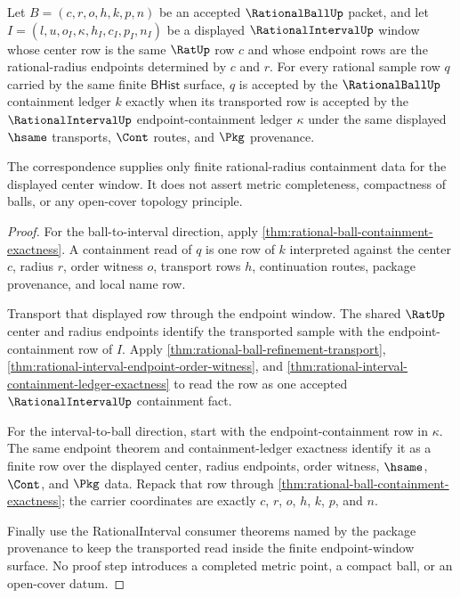 \begin{theorem}
\label{thm:rationalball-interval-center-containment}
Let $B=(c,r,o,h,k,p,n)$ be an accepted $\RationalBallUp$ packet, and let
$I=(l,u,o_I,\kappa,h_I,c_I,p_I,n_I)$ be a displayed
$\RationalIntervalUp$ window whose center row is the same $\RatUp$ row $c$ and
whose endpoint rows are the rational-radius endpoints determined by $c$ and
$r$. For every rational sample row $q$ carried by the same finite
$\mathsf{BHist}$ surface, $q$ is accepted by the $\RationalBallUp$ containment
ledger $k$ exactly when its transported row is accepted by the
$\RationalIntervalUp$ endpoint-containment ledger $\kappa$ under the same
displayed $\hsame$ transports, $\Cont$ routes, and $\Pkg$ provenance.

The correspondence supplies only finite rational-radius containment data for
the displayed center window. It does not assert metric completeness,
compactness of balls, or any open-cover topology principle.
\end{theorem}
\begin{proof}
For the ball-to-interval direction, apply
\autoref{thm:rational-ball-containment-exactness}. A containment read of $q$
is one row of $k$ interpreted against the center $c$, radius $r$, order witness
$o$, transport rows $h$, continuation routes, package provenance, and local
name row.

Transport that displayed row through the endpoint window. The shared
$\RatUp$ center and radius endpoints identify the transported sample with the
endpoint-containment row of $I$. Apply
\autoref{thm:rational-ball-refinement-transport},
\autoref{thm:rational-interval-endpoint-order-witness}, and
\autoref{thm:rational-interval-containment-ledger-exactness} to read the row as
one accepted $\RationalIntervalUp$ containment fact.

For the interval-to-ball direction, start with the endpoint-containment row in
$\kappa$. The same endpoint theorem and containment-ledger exactness identify
it as a finite row over the displayed center, radius endpoints, order witness,
$\hsame$, $\Cont$, and $\Pkg$ data. Repack that row through
\autoref{thm:rational-ball-containment-exactness}; the carrier coordinates are
exactly $c$, $r$, $o$, $h$, $k$, $p$, and $n$.

Finally use the RationalInterval consumer theorems named by the package
provenance to keep the transported read inside the finite endpoint-window
surface. No proof step introduces a completed metric point, a compact ball, or
an open-cover datum.
\end{proof}

